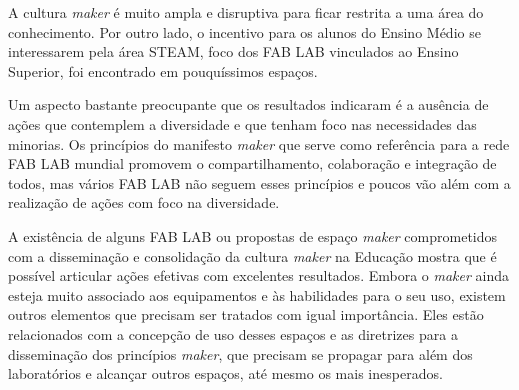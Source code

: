 \documentclass[portuguese]{textolivre}
\begin{document}
A cultura \textit{maker} é muito ampla e disruptiva para ficar restrita a uma área do conhecimento. Por outro lado, o incentivo para os alunos do Ensino Médio se interessarem pela área STEAM, foco dos FAB LAB vinculados ao Ensino Superior, foi encontrado em pouquíssimos espaços.

Um aspecto bastante preocupante que os resultados indicaram é a ausência de ações que contemplem a diversidade e que tenham foco nas necessidades das minorias. Os princípios do manifesto \textit{maker} que serve como referência para a rede FAB LAB mundial promovem o compartilhamento, colaboração e integração de todos, mas vários FAB LAB não seguem esses princípios e poucos vão além com a realização de ações com foco na diversidade.

A existência de alguns FAB LAB ou propostas de espaço \textit{maker} comprometidos com a disseminação e consolidação da cultura \textit{maker} na Educação mostra que é possível articular ações efetivas com excelentes resultados. Embora o \textit{maker} ainda esteja muito associado aos equipamentos e às habilidades para o seu uso, existem outros elementos que precisam ser tratados com igual importância. Eles estão relacionados com a concepção de uso desses espaços e as diretrizes para a disseminação dos princípios \textit{maker}, que precisam se propagar para além dos laboratórios e alcançar outros espaços, até mesmo os mais inesperados.


{\small
\printbibliography\label{sec-bib}
}
\end{document}
